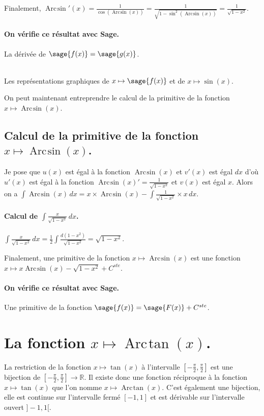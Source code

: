 \documentclass[a4paper,12pt]{report}
\def\eclaire{\mathbb}
\def\R{\ensuremath{\eclaire R}}
\renewcommand{\arcsin}{\mathop{\mathrm{Arc\mspace{2mu}sin}}}
\renewcommand{\arctan}{\mathop{\mathrm{Arc\mspace{2mu}tan}}}
\begin{document}
Finalement, $\arcsin\nolimits'(x)  = \frac{1}{\cos(\arcsin(x))}  = \frac{1}{\sqrt{1-\sin^2(\arcsin(x))}} =  \frac{1}{\sqrt{1- x^2}} $.
\paragraph{On vérifie ce résultat avec Sage.}
La dérivée de $\sage{f(x)} = \sage{g(x)} $.


\begin{center}
\\
Les représentations graphiques de $x \mapsto \sage{f(x)} $ et de $x\mapsto \sin(x)$.
\end{center}
On peut maintenant entreprendre le calcul de la primitive de la  fonction  $x \mapsto \arcsin(x) $.

\subsection{Calcul de la primitive de la fonction  $x \mapsto \arcsin(x) $.}
Je pose que $u(x)$  est égal à la fonction $\arcsin(x)$ et $v'(x)$ est égal $dx$  d'où $u'(x)$  est égal à la fonction $\arcsin(x) ' = \frac{1}{\sqrt{1- x^2}} $ et $v(x)$ est égal $x$.
Alors on a $\int \arcsin(x) \, dx = x \times \arcsin(x) -\int \frac{1}{\sqrt{1- x^2}} \times x \, dx $.


\paragraph{Calcul de $\int \frac{x}{\sqrt{1- x^2}} \, dx $.}
$\int \frac{x}{\sqrt{1- x^2}} \, dx = \frac{1}{2} \int \frac{d(1-x^2)}{\sqrt{1- x^2}}= \sqrt{1- x^2} $.

Finalement, une primitive de la fonction $x \mapsto \arcsin(x) $ est une fonction  $ x \mapsto x \arcsin(x) - \sqrt{1- x^2} + C^{ste} $.
\paragraph{On vérifie ce résultat avec Sage.}
Une primitive de la fonction $\sage{f(x)} = \sage{F(x)} + C^{ste}$.


\section{La fonction  $x \mapsto \arctan(x) $.}
La restriction de la fonction $x \mapsto \tan(x) $ à l'intervalle $\left[-\frac{\pi}{2},\frac{\pi}{2}\right]$ est une bijection de $\left[-\frac{\pi}{2},\frac{\pi}{2}\right] \rightarrow \R $. Il existe donc une fonction réciproque à la fonction $x \mapsto \tan(x) $ que l'on nomme $x \mapsto \arctan(x) $. C'est également une bijection, elle est continue sur l'intervalle fermé  $ [-1,1]$ et est dérivable sur l'intervalle ouvert $]-1,1[$.
\end{document}
